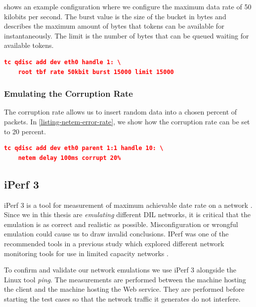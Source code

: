 shows an example configuration where we configure
the maximum data rate of 50 kilobits per second. The burst value is the size of
the bucket in bytes and describes the maximum amount of bytes that tokens can be
available for instantaneously. The limit is the number of bytes that can be
queued waiting for available tokens.

\begin{lstlisting}[frame=single, language=json, caption="Emulating the data rate", label=listing-netem-data-rate]
  tc qdisc add dev eth0 handle 1: \
    root tbf rate 50kbit burst 15000 limit 15000
\end{lstlisting}

\subsubsection{Emulating the Corruption Rate}

The corruption rate allows us to insert random data into a chosen percent of
packets. In \cref{listing-netem-error-rate}, we show how the corruption rate can
be set to 20 percent.

\begin{lstlisting}[frame=single, language=json, caption="Emulating the corruption rate", label=listing-netem-error-rate]
  tc qdisc add dev eth0 parent 1:1 handle 10: \
    netem delay 100ms corrupt 20%
\end{lstlisting}


\subsection{iPerf 3}

iPerf 3 is a tool for measurement of maximum achievable date rate on a network
\cite{iperf3-homepage}. Since we in this thesis are \textit{emulating} different
DIL networks, it is critical that the emulation is as correct and realistic as
possible. Misconfiguration or wrongful emulation could cause us to draw invalid
conclusions. IPerf was one of the recommended tools in a previous study which
explored different network monitoring tools for use in limited capacity
networks \cite{bloebaum-monitoring}.

To confirm and validate our network emulations we use iPerf 3 alongside the
Linux tool \textit{ping}. The measurements are performed between the machine
hosting the client and the machine hosting the Web service. They are performed
before starting the test cases so that the network traffic it generates do not
interfere.


